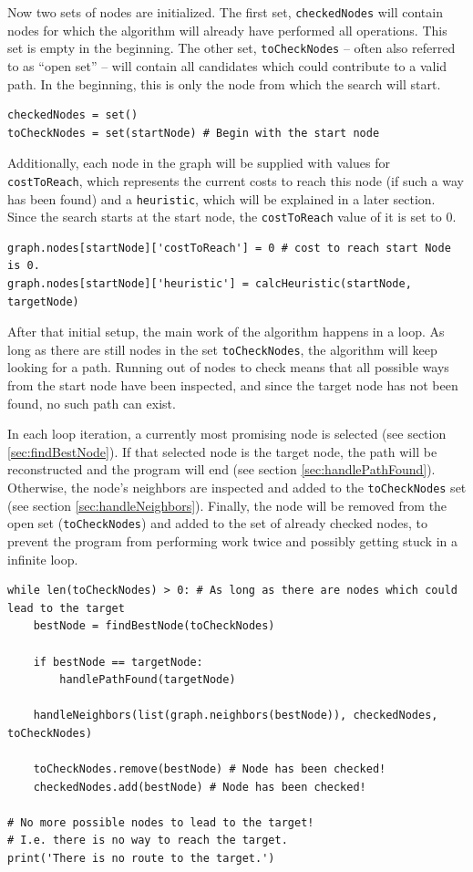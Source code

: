 \documentclass[12pt]{article}
\begin{document}
Now two sets of nodes are initialized.
The first set, \texttt{checkedNodes} will contain nodes for which the algorithm will already have performed all operations.
This set is empty in the beginning.
The other set, \texttt{toCheckNodes} -- often also referred to as \enquote{open set} -- will contain all candidates which could contribute to a valid path.
In the beginning, this is only the node from which the search will start.
\begin{lstlisting}
checkedNodes = set()
toCheckNodes = set(startNode) # Begin with the start node
\end{lstlisting}
Additionally, each node in the graph will be supplied with values for \texttt{costToReach}, which represents the current costs to reach this node (if such a way has been found) and a \texttt{heuristic}, which will be explained in a later section.
Since the search starts at the start node, the \texttt{costToReach} value of it is set to 0.
\begin{lstlisting}
graph.nodes[startNode]['costToReach'] = 0 # cost to reach start Node is 0.
graph.nodes[startNode]['heuristic'] = calcHeuristic(startNode, targetNode)
\end{lstlisting}

After that initial setup, the main work of the algorithm happens in a loop.
As long as there are still nodes in the set \texttt{toCheckNodes}, the algorithm will keep looking for a path.
Running out of nodes to check means that all possible ways from the start node have been inspected, and since the target node has not been found, no such path can exist.

In each loop iteration, a currently most promising node is selected (see section \ref{sec:findBestNode}).
If that selected node is the target node, the path will be reconstructed and the program will end (see section \ref{sec:handlePathFound}).
Otherwise, the node's neighbors are inspected and added to the \texttt{toCheckNodes} set (see section \ref{sec:handleNeighbors}).
Finally, the node will be removed from the open set (\texttt{toCheckNodes}) and added to the set of already checked nodes, to prevent the program from performing work twice and possibly getting stuck in a infinite loop.

\begin{lstlisting}
while len(toCheckNodes) > 0: # As long as there are nodes which could lead to the target
	bestNode = findBestNode(toCheckNodes)
	
	if bestNode == targetNode:
		handlePathFound(targetNode)
	
	handleNeighbors(list(graph.neighbors(bestNode)), checkedNodes, toCheckNodes)
	
	toCheckNodes.remove(bestNode) # Node has been checked!
	checkedNodes.add(bestNode) # Node has been checked!

# No more possible nodes to lead to the target!
# I.e. there is no way to reach the target.
print('There is no route to the target.')
\end{lstlisting}
\end{document}
